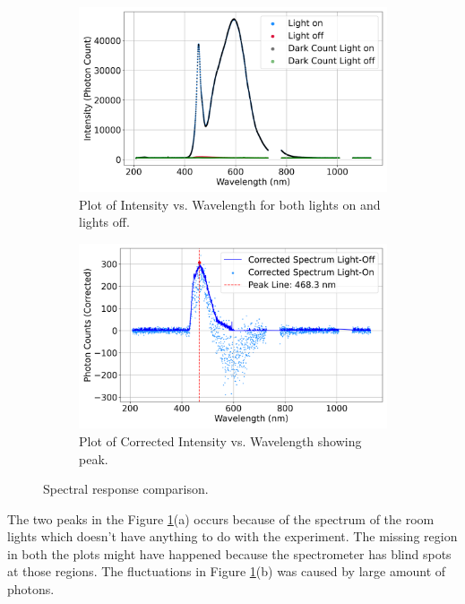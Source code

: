     \begin{figure}[H]
        \centering
        \begin{subfigure}[b]{0.48\textwidth}
            \centering
            \includegraphics[width=\textwidth, scale=0.35]{Figure/spectrum_high_res.png}
            \caption{Plot of Intensity vs. Wavelength for both lights on and lights off.}
        \end{subfigure}
        \hfill
        \begin{subfigure}[b]{0.48\textwidth}
            \centering
            \includegraphics[width=\textwidth, scale=0.35]{Figure/corrected_spectrum_high_res.png}
            \caption{Plot of Corrected Intensity vs. Wavelength showing peak.}
        \end{subfigure}
        \caption{Spectral response comparison.}
        \label{spectral}
    \end{figure}

    The two peaks in the Figure \ref{spectral}(a) occurs because of the spectrum of the room lights which doesn't have anything to do with the experiment. The missing region in both the plots might have happened because the spectrometer has blind spots at those regions. The fluctuations in Figure \ref{spectral}(b) was caused by large amount of photons. 

